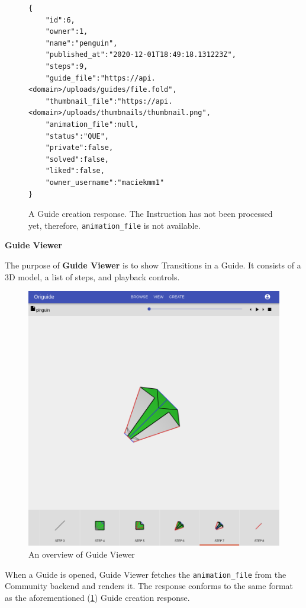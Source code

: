 \begin{figure}[H]
	\caption{A Guide creation response. The Instruction has not been processed yet, therefore, \texttt{animation\_file} is not available.}
	\label{guide-response}
	\begin{lstlisting}
{
	"id":6,
	"owner":1,
	"name":"penguin",
	"published_at":"2020-12-01T18:49:18.131223Z",
	"steps":9,
	"guide_file":"https://api.<domain>/uploads/guides/file.fold",
	"thumbnail_file":"https://api.<domain>/uploads/thumbnails/thumbnail.png",
	"animation_file":null,
	"status":"QUE",
	"private":false,
	"solved":false,
	"liked":false,
	"owner_username":"maciekmm1"
}
	\end{lstlisting}
\end{figure}


\textbf{Guide Viewer}

The purpose of \textbf{Guide Viewer} is to show Transitions in a Guide. It consists of a 3D model, a list of steps, and playback controls.

\begin{figure}[H]
  \caption{An overview of Guide Viewer}
  \label{3-guide-viewer}
  \centering
    \includegraphics[width=\textwidth]{assets/3-guide-viewer.png}
\end{figure}

When a Guide is opened, Guide Viewer fetches the \texttt{animation\_file} from the Community backend and renders it.
The response conforms to the same format as the aforementioned (\ref{guide-response}) Guide creation response.

